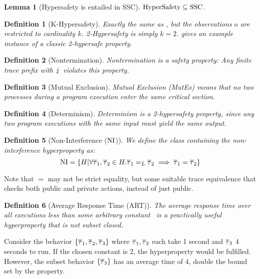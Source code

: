 \documentclass[a4paper,names,dvipsnames]{article}
\newtheorem{definition}{Definition}
\newtheorem{lemma}{Lemma}
\begin{document}
\begin{lemma}[Hypersafety is entailed in SSC]
  $\text{HyperSafety}\subseteq\text{SSC}$.
\end{lemma}

\begin{definition}[K-Hypersafety]
  Exactly the same as , but the observations $o$ are restricted to cardinality $k$.
  2-Hypersafety is simply $k=2$.  gives an example instance of a classic 2-hypersafe property.
\end{definition}

\begin{definition}[Nontermination]
  Nontermination is a safety property: Any finite trace prefix with $\lightning$ violates this property.
\end{definition}

\begin{definition}[Mutual Exclusion]
  Mutual Exclusion (MutEx) means that no two processes during a program execution enter the same critical section.
\end{definition}

\begin{definition}[Determinism]
  Determinism is a 2-hypersafety property, since any two program executions with the same input must yield the same output.
\end{definition}

\begin{definition}[Non-Interference ($\text{NI}$)]\label{def:ni}
  We define the class containing the non-interference hyperproperty as:
  $$
  \text{NI} = \left\{ H | \forall \overline{\tau}_{1},\overline{\tau}_{2}\in H. {\overline{\tau}_{1}}=_L{\overline{\tau}_{2}}\implies\overline{\tau}_{1}=\overline{\tau}_{2} \right\}
  $$
\end{definition}
Note that $=$ may not be strict equality, but some suitable trace equivalence that checks both public and private actions, instead of just public.

\begin{definition}[Average Response Time (ART)]
  The average response time over all executions less than some arbitrary constant~\cite{clarkson08} is a practically useful hyperproperty that is not subset closed.
\end{definition}
Consider the behavior $\{\overline{\tau}_{1},\overline{\tau}_{2},\overline{\tau}_{3}\}$ where $\overline{\tau}_{1},\overline{\tau}_{2}$ each take 1 second and $\overline{\tau}_{3}$ 4 seconds to run.
If the chosen constant is 2, the hyperproperty would be fulfilled. However, the subset behavior $\{\overline{\tau}_{3}\}$ has an average time of 4, double the bound set by the property.
\end{document}
